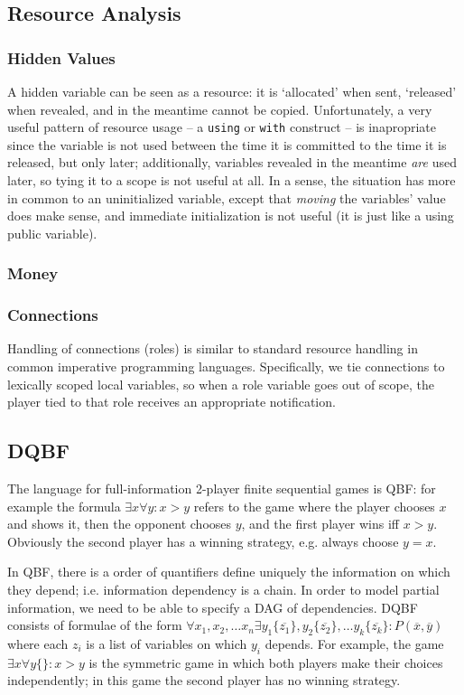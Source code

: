 \documentclass[acmsmall,review,anonymous]{acmart}\settopmatter{printfolios=true,printccs=false,printacmref=false}
\begin{document}
\subsection{Resource Analysis}
\subsubsection{Hidden Values}
A hidden variable can be seen as a resource: it is `allocated' when sent, `released' when revealed, and in the meantime cannot be copied. Unfortunately, a very useful pattern of resource usage -- a \texttt{using} or \texttt{with} construct -- is inapropriate since the variable is not used between the time it is committed to the time it is released, but only later; additionally, variables revealed in the meantime \textit{are} used later, so tying it to a scope is not useful at all. In a sense, the situation has more in common to an uninitialized variable, except that \textit{moving} the variables' value does make sense, and immediate initialization is not useful (it is just like a using public variable).

\subsubsection{Money}

\subsubsection{Connections}

Handling of connections (roles) is similar to standard resource handling in common imperative programming languages. Specifically, we tie connections to lexically scoped local variables, so when a role variable goes out of scope, the player tied to that role receives an appropriate notification.

\subsection{DQBF}
The language for full-information 2-player finite sequential games is QBF: for example the formula $\exists x \forall y: x > y$ refers to the game where the player chooses $x$ and shows it, then the opponent chooses $y$, and the first player wins iff $x > y$. Obviously the second player has a winning strategy, e.g. always choose $y=x$.

In QBF, there is a order of quantifiers define uniquely the information on which they depend; i.e. information dependency is a chain. In order to model partial information, we need to be able to specify a DAG of dependencies. DQBF consists of formulae of the form $\forall x_1, x_2, \ldots x_n \exists y_1 \{\overline{z_1}\}, y_2 \{\overline{z_2}\}, \ldots y_k \{\overline{z_k}\}: P(\overline{x}, \overline{y})$ where each $z_i$ is a list of variables on which $y_i$ depends. For example, the game $\exists x \forall y\{\}: x > y$ is the symmetric game in which both players make their choices independently; in this game the second player has no winning strategy.
\end{document}
